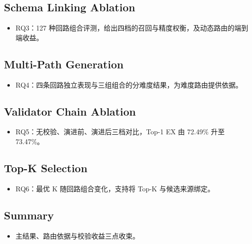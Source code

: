 \subsection{Schema Linking Ablation}
\label{sec:exp-schema-linking}

\begin{zhoutline}
\begin{itemize}
\item RQ3：127 种回路组合评测，给出四档的召回与精度权衡，及动态路由的端到端收益。
\end{itemize}
\end{zhoutline}

\subsection{Multi-Path Generation}
\label{sec:exp-generation}

\begin{zhoutline}
\begin{itemize}
\item RQ4：四条回路独立表现与三组组合的分难度结果，为难度路由提供依据。
\end{itemize}
\end{zhoutline}

\subsection{Validator Chain Ablation}
\label{sec:exp-validator}

\begin{zhoutline}
\begin{itemize}
\item RQ5：无校验、演进前、演进后三档对比，Top-1 EX 由 72.49\% 升至 73.47\%。
\end{itemize}
\end{zhoutline}

\subsection{Top-K Selection}
\label{sec:exp-topk}

\begin{zhoutline}
\begin{itemize}
\item RQ6：最优 K 随回路组合变化，支持将 Top-K 与候选来源绑定。
\end{itemize}
\end{zhoutline}

\subsection{Summary}
\label{sec:exp-summary}

\begin{zhoutline}
\begin{itemize}
\item 主结果、路由依据与校验收益三点收束。
\end{itemize}
\end{zhoutline}
